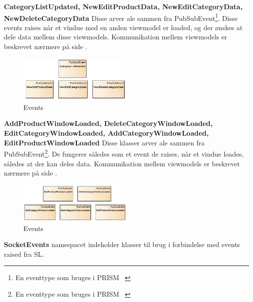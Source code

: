 \textbf{CategoryListUpdated, NewEditProductData, NewEditCategoryData, NewDeleteCategoryData}
Disse arver ale sammen fra PubSubEvent\footnote{En eventtype som bruges i PRISM ~\cite{PRISM}}. Disse events raises når et vindue med en anden viewmodel er loaded, og der ønskes at dele data mellem disse viewmodels. Kommunikation mellem viewmodels er beskrevet nærmere på side \pageref{viewcomm}.  \bigskip
\begin{center}
\begin{figure}[!h]
    \centering
    \includegraphics[width=0.50\textwidth]{Systemdesign/backend/klassebeskrivelser/Images/Events1.png}
    \caption{Events}
    \label{fig:CategoryListUpdated}
\end{figure}
\end{center}
\label{CategoryListUpdated_Beskrivelse}
 \bigskip 




\textbf{AddProductWindowLoaded, DeleteCategoryWindowLoaded, EditCategoryWindowLoaded, AddCategoryWindowLoaded, EditProductWindowLoaded}
Disse klasser arver ale sammen fra PubSubEvent\footnote{En eventtype som bruges i PRISM ~\cite{PRISM}}. De fungerer således som et event de raises, når et vindue loades, således at der kan deles data. Kommunikation mellem viewmodels er beskrevet nærmere på side \pageref{viewcomm}. \bigskip
\begin{center}
\begin{figure}[!h]
    \centering
    \includegraphics[width=0.50\textwidth]{Systemdesign/backend/klassebeskrivelser/Images/Events2.png}
    \caption{Events}
    \label{fig:AddProductWindowLoaded}
\end{figure}
\end{center}
\label{AddProductWindowLoaded_Beskrivelse}
 \bigskip 


\bigskip
\bigskip

\textbf{SocketEvents} namespacet indeholder klasser til brug i forbindelse med events raised fra \gls{SL}.\\
\bigskip

